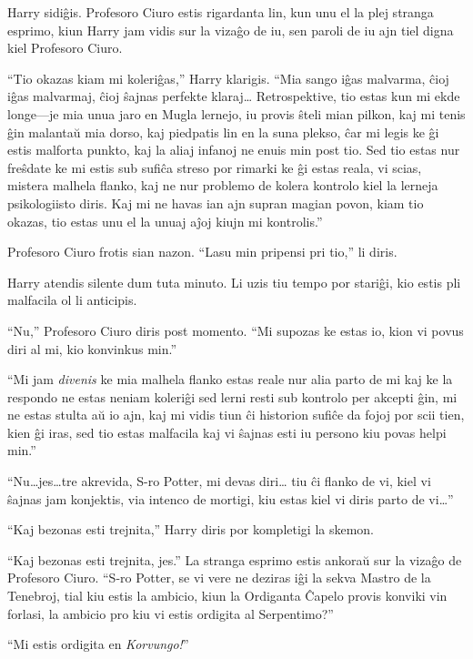 Harry sidiĝis. Profesoro Ciuro estis rigardanta lin, kun unu el la
plej stranga esprimo, kiun Harry jam vidis sur la vizaĝo de iu, sen
paroli de iu ajn tiel digna kiel Profesoro Ciuro.

``Tio okazas kiam mi koleriĝas,'' Harry klarigis. ``Mia sango iĝas
malvarma, ĉioj iĝas malvarmaj, ĉioj ŝajnas perfekte klaraj\ldots
Retrospektive, tio estas kun mi ekde longe—je mia unua jaro en Mugla
lernejo, iu provis ŝteli mian pilkon, kaj mi tenis ĝin malantaŭ mia
dorso, kaj piedpatis lin en la suna plekso, ĉar mi legis ke ĝi estis
malforta punkto, kaj la aliaj infanoj ne enuis min post tio. Sed tio
estas nur freŝdate ke mi estis sub sufiĉa streso por rimarki ke ĝi
estas reala, vi scias, mistera malhela flanko, kaj ne nur problemo de
kolera kontrolo kiel la lerneja psikologiisto diris. Kaj mi ne havas
ian ajn supran magian povon, kiam tio okazas, tio estas unu el la
unuaj aĵoj kiujn mi kontrolis.''

Profesoro Ciuro frotis sian nazon. ``Lasu min pripensi pri tio,'' li diris.

Harry atendis silente dum tuta minuto. Li uzis tiu tempo por stariĝi,
kio estis pli malfacila ol li anticipis.

``Nu,'' Profesoro Ciuro diris post momento. ``Mi supozas ke estas io,
kion vi povus diri al mi, kio konvinkus min.''

``Mi jam \emph{divenis} ke mia malhela flanko estas reale nur alia
parto de mi kaj ke la respondo ne estas neniam koleriĝi sed lerni
resti sub kontrolo per akcepti ĝin, mi ne estas stulta aŭ io ajn, kaj
mi vidis tiun ĉi historion sufiĉe da fojoj por scii tien, kien ĝi
iras, sed tio estas malfacila kaj vi ŝajnas esti iu persono kiu
povas helpi min.''

``Nu\ldots jes\ldots tre akrevida, S-ro Potter, mi devas diri\ldots
tiu ĉi flanko de vi, kiel vi ŝajnas jam konjektis, via intenco de
mortigi, kiu estas kiel vi diris parto de vi\ldots''

``Kaj bezonas esti trejnita,'' Harry diris por kompletigi la skemon.

``Kaj bezonas esti trejnita, jes.'' La stranga esprimo estis ankoraŭ
sur la vizaĝo de Profesoro Ciuro. ``S-ro Potter, se vi vere ne deziras
iĝi la sekva Mastro de la Tenebroj, tial kiu estis la ambicio, kiun la
Ordiganta Ĉapelo provis konviki vin forlasi, la ambicio pro kiu vi
estis ordigita al Serpentimo?''

``Mi estis ordigita en \emph{Korvungo!}''

